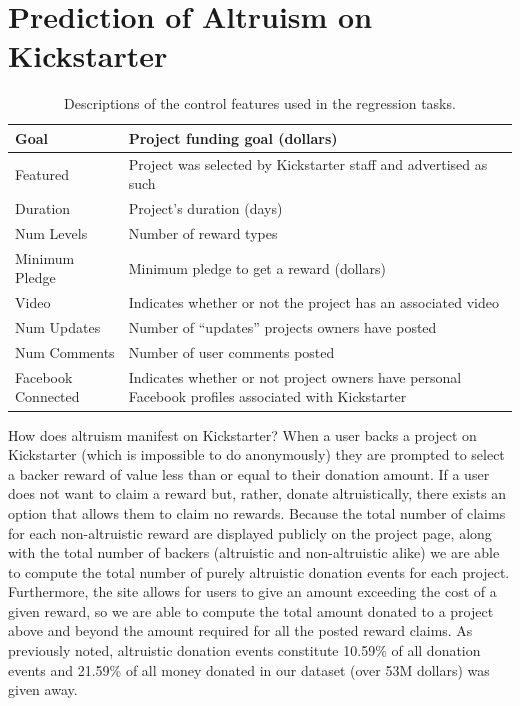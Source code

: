 \documentclass[letterpaper]{article}
\begin{document}
\section{Prediction of Altruism on Kickstarter}
\begin{table}
\centering
\begin{tabular}{|l|L{5cm}|}
\hline
Goal & Project funding goal (dollars) \\\hline
Featured & Project was selected by Kickstarter staff and advertised as such\\\hline
Duration & Project's duration (days) \\\hline
Num Levels & Number of reward types \\\hline
Minimum Pledge & Minimum pledge to get a reward (dollars)\\\hline
Video & Indicates whether or not the project has an associated video \\\hline
Num Updates & Number of ``updates'' projects owners have posted \\\hline
Num Comments & Number of user comments posted \\\hline
Facebook Connected & Indicates whether or not project owners have personal Facebook profiles associated with Kickstarter\\
\hline
\end{tabular}
\caption{Descriptions of the control features used in the regression tasks.}
\label{tab:controls}
\end{table}
How does altruism manifest on Kickstarter? When a user backs a project on Kickstarter (which is impossible to do anonymously) they are prompted to select a backer reward of value less than or equal to their donation amount. If a user does not want to claim a reward but, rather, donate altruistically, there exists an option that allows them to claim no rewards. Because the total number of claims for each non-altruistic reward are displayed publicly on the project page, along with the total number of backers (altruistic and non-altruistic alike) we are able to compute the total number of purely altruistic donation events for each project. Furthermore, the site allows for users to give an amount exceeding the cost of a given reward, so we are able to compute the total amount donated to a project above and beyond the amount required for all the posted reward claims. As previously noted, altruistic donation events constitute 10.59\% of all donation events and 21.59\% of all money donated in our dataset (over 53M dollars) was given away.
\end{document}
